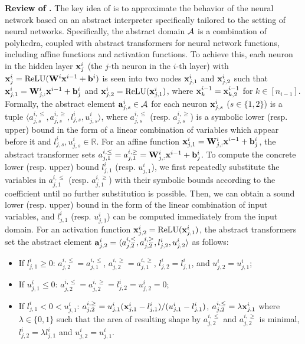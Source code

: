 \smallskip
\noindent
{\bf Review of \deepPoly.}
The key idea of \deepPoly is to approximate the behavior of the neural network based on an abstract interpreter specifically tailored to the setting of neural networks. Specifically, the abstract domain ${\mathcal{A}}$ is a combination of polyhedra, coupled with abstract transformers for neural network functions, including affine functions and activation functions. To achieve this, each neuron in the hidden layer ${\mathbf{x}}^i_j$ (the $j$-th neuron in the $i$-th layer) with ${\mathbf{x}}^i_j = \text{ReLU}({\mathbf{W}}^i{\mathbf{x}}^{i-1}+{\mathbf{b}}^i)$ is seen into two nodes ${\mathbf{x}}^i_{j,1}$ and ${\mathbf{x}}^{i}_{j,2}$ such that ${\mathbf{x}}^{i}_{j,1}={\mathbf{W}}^i_{j,:}{\mathbf{x}}^{i-1}+{\mathbf{b}}^i_j$ and ${\mathbf{x}}^i_{j,2}=\text{ReLU}({\mathbf{x}}^i_{j,1})$, where ${\mathbf{x}}^{i-1}_{k}={\mathbf{x}}^{i-1}_{k,2}$ for $k\in[n_{i-1}]$.
% 
Formally, the abstract element ${\mathbf{a}}^i_{j,s}\in{\mathcal{A}}$ for each neuron ${\mathbf{x}}^i_{j,s}$ ($s\in\{1,2\}$) is a tuple $\langle a^{i,\le}_{j,s}, a^{i,\ge}_{j,s}, l^i_{j,s}, u^i_{j,s}\rangle$, where $a^{i,\le}_{j,s}$ (resp. $a^{i,\ge}_{j,s}$) is a symbolic lower (resp. upper) bound in the form of a linear combination of variables which appear before it and $l^i_{j,s},u^i_{j,s}\in\mathbb{R}$. 
% 
For an affine function ${\mathbf{x}}^i_{j,1}={\mathbf{W}}^i_{j,:}{\mathbf{x}}^{i-1}+{\mathbf{b}}^i_j$, the abstract transformer sets $a^{i,\le}_{j,1}=a^{i,\ge}_{j,1}={\mathbf{W}}^i_{j,:}{\mathbf{x}}^{i-1}+{\mathbf{b}}^i_j$. To compute the concrete lower (resp. upper) bound $l^i_{j,1}$ (resp. $u^i_{j,1}$), we first repeatedly substitute the variables in $a^{i,\le}_{j,1}$ (resp. $a^{i,\ge}_{j,1}$) with their symbolic bounds according to the coefficient until no further substitution is possible. Then, we can obtain a sound lower (resp. upper) bound in the form of the linear combination of input variables, and $l^i_{j,1}$ (resp. $u^i_{j,1}$) can be computed immediately from the input domain.
% 
For an activation function ${\mathbf{x}}^{i}_{j,2}=\text{ReLU}({\mathbf{x}}^i_{j,1})$, the abstract transformers set the abstract element ${\mathbf{a}}^i_{j,2}=\langle a^{i,\le}_{j,2},a^{i,\ge}_{j,2}, l^i_{j,2}, u^i_{j,2}\rangle$ as follows:
\begin{itemize}
    \item If $l^i_{j,1}\ge 0$: $a^{i,\le}_{j,2}= a^{i,\le}_{j,1}$, $a^{i,\ge}_{j,2}=a^{i,\ge}_{j,1}$, $l^i_{j,2}=l^i_{j,1}$, and $u^i_{j,2}=u^i_{j,1}$;
    \item If $u^i_{j,1}\le 0$: $a^{i,\le}_{j,2}=a^{i,\ge}_{j,2}=l^i_{j,2}=u^i_{j,2}=0$; 
    \item If $l^i_{j,1}< 0 < u^i_{j,1}$: $a^{i,\ge}_{j,2}=u^i_{j,1}({\mathbf{x}}^{i}_{j,1}-l^i_{j,1})/(u^i_{j,1}-l^i_{j,1})$, $a^{i,\le}_{j,2}=\lambda{\mathbf{x}}^i_{j,1}$ where $\lambda\in\{0,1\}$ such that the area of resulting shape by $a^{i,\le}_{j,2}$ and $a^{i,\ge}_{j,2}$ is minimal, $l^i_{j,2}=\lambda l^i_{j,1}$ and $u^i_{j,2}=u^i_{j,1}$.
\end{itemize}

